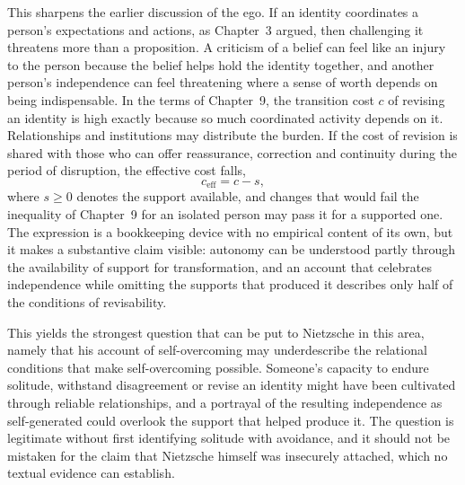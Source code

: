 This sharpens the earlier discussion of the ego. If an identity coordinates a person's expectations and actions, as Chapter~3 argued, then challenging it threatens more than a proposition. A criticism of a belief can feel like an injury to the person because the belief helps hold the identity together, and another person's independence can feel threatening where a sense of worth depends on being indispensable. In the terms of Chapter~9, the transition cost $c$ of revising an identity is high exactly because so much coordinated activity depends on it. Relationships and institutions may distribute the burden. If the cost of revision is shared with those who can offer reassurance, correction and continuity during the period of disruption, the effective cost falls,
\[
c_{\mathrm{eff}}=c-s,
\]
where $s\ge 0$ denotes the support available, and changes that would fail the inequality of Chapter~9 for an isolated person may pass it for a supported one. The expression is a bookkeeping device with no empirical content of its own, but it makes a substantive claim visible: autonomy can be understood partly through the availability of support for transformation, and an account that celebrates independence while omitting the supports that produced it describes only half of the conditions of revisability.

This yields the strongest question that can be put to Nietzsche in this area, namely that his account of self-overcoming may underdescribe the relational conditions that make self-overcoming possible. Someone's capacity to endure solitude, withstand disagreement or revise an identity might have been cultivated through reliable relationships, and a portrayal of the resulting independence as self-generated could overlook the support that helped produce it. The question is legitimate without first identifying solitude with avoidance, and it should not be mistaken for the claim that Nietzsche himself was insecurely attached, which no textual evidence can establish.

